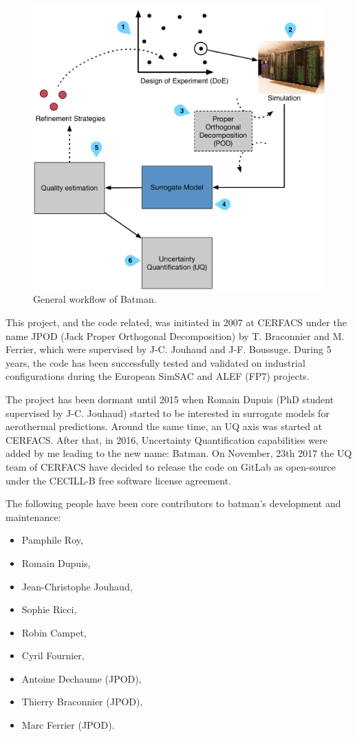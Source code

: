 \begin{figure}[!ht]
\centering
\includegraphics[width=0.8\linewidth,keepaspectratio]{fig/contributions/batman/workflow.pdf}
\caption{General workflow of Batman.}
\label{fig:batman_workflow}
\end{figure}

This project, and the code related, was initiated in 2007 at CERFACS under the name JPOD (Jack Proper Orthogonal Decomposition) by T. Braconnier and M. Ferrier, which were supervised by J-C. Jouhaud and J-F. Boussuge. During 5 years, the code has been successfully tested and validated on industrial configurations during the European SimSAC and ALEF (FP7) projects.

The project has been dormant until 2015 when Romain Dupuis (PhD student supervised by J-C. Jouhaud) started to be interested in surrogate models for aerothermal predictions. Around the same time, an UQ axis was started at CERFACS. After that, in 2016, Uncertainty Quantification capabilities were added by me leading to the new name: Batman. On November, 23th 2017 the UQ team of CERFACS have decided to release the code on GitLab as open-source under the CECILL-B free software license agreement.

The following people have been core contributors to batman's development and maintenance:

\begin{itemize}
\item Pamphile Roy,
\item Romain Dupuis,
\item Jean-Christophe Jouhaud,
\item Sophie Ricci,
\item Robin Campet,
\item Cyril Fournier,
\item Antoine Dechaume (JPOD),
\item Thierry Braconnier (JPOD),
\item Marc Ferrier (JPOD).
\end{itemize}

